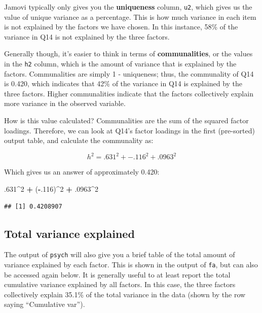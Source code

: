 \documentclass[
]{book}
\newenvironment{Shaded}{\begin{snugshade}}{\end{snugshade}}
\newcommand{\DecValTok}[1]{\textcolor[rgb]{0.00,0.00,0.81}{#1}}
\newcommand{\NormalTok}[1]{#1}
\newcommand{\SpecialCharTok}[1]{\textcolor[rgb]{0.81,0.36,0.00}{\textbf{#1}}}
\begin{document}
Jamovi typically only gives you the \textbf{uniqueness} column, \texttt{u2}, which gives us the value of unique variance as a percentage. This is how much variance in each item is not explained by the factors we have chosen. In this instance, 58\% of the variance in Q14 is not explained by the three factors.

Generally though, it's easier to think in terms of \textbf{communalities}, or the values in the \texttt{h2} column, which is the amount of variance that is explained by the factors. Communalities are simply 1 - uniqueness; thus, the communality of Q14 is 0.420, which indicates that 42\% of the variance in Q14 is explained by the three factors. Higher communalities indicate that the factors collectively explain more variance in the observed variable.

How is this value calculated? Communalities are the sum of the squared factor loadings. Therefore, we can look at Q14's factor loadings in the first (pre-sorted) output table, and calculate the communality as:

\[
h^2 = .631^2 + -.116^2 + .0963^2
\]

Which gives us an answer of approximately 0.420:

\begin{Shaded}
\begin{Highlighting}[]
\NormalTok{.}\DecValTok{631}\SpecialCharTok{\^{}}\DecValTok{2} \SpecialCharTok{+}\NormalTok{ (}\SpecialCharTok{{-}}\NormalTok{.}\DecValTok{116}\NormalTok{)}\SpecialCharTok{\^{}}\DecValTok{2} \SpecialCharTok{+}\NormalTok{ .}\DecValTok{0963}\SpecialCharTok{\^{}}\DecValTok{2}
\end{Highlighting}
\end{Shaded}

\begin{verbatim}
## [1] 0.4208907
\end{verbatim}

\subsection{Total variance explained}\label{total-variance-explained}

The output of \texttt{psych} will also give you a brief table of the total amount of variance explained by each factor. This is shown in the output of \texttt{fa}, but can also be accessed again below. It is generally useful to at least report the total cumulative variance explained by all factors. In this case, the three factors collectively explain 35.1\% of the total variance in the data (shown by the row saying ``Cumulative var'').
\end{document}
